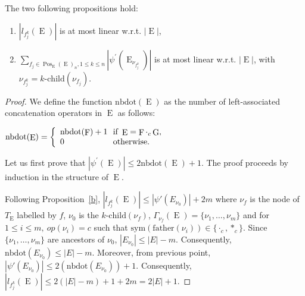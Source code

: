 \documentclass{llncs}
\def\Po#1#2{\Pos_{#1}{(#2)}}
\DeclareMathOperator{\E}{E}
\DeclareMathOperator{\f}{F}
\DeclareMathOperator{\G}{G}
\DeclareMathOperator{\Pos}{Pos}
\begin{document}
\begin{proposition}\label{prop long pseudo cont lin}
The two following propositions hold:
  \begin{enumerate}
    \item $|l_{f^k_j}(\E)|$ is at most linear w.r.t. $ |\E|$,
    \item $\sum_{f_j\in \Po{\E}{\E}_n,1\leq k\leq n} |\psi^{\prime}(\E_{\nu_{f^k_j}})| $ is at most linear w.r.t. $ |\E|$, with $\nu_{f^k_j}=k\mbox{-}\mathrm{child}(\nu_{f_j})$. 
  \end{enumerate} 
\end{proposition}
  \begin{proof}
  
We define the function $\mathrm{nbdot}(\E)$ as the number of 
left-associated
 concatenation operators
 in $\E$ as follows: 

\centerline{
    $\mathrm{nbdot}(\E)=
      \left\{
        \begin{array}{l@{\ }l}
          \mathrm{nbdot}(\f)+1 & \text{ if } \E=\f\cdot_c\G,\\
          0 & \text{ otherwise. }\\ 
        \end{array}
      \right.$
  }
 


 Let us first prove that $|\psi^{\prime}(\E)|\leq 2\mathrm{nbdot}(\E)+1$. The proof proceeds by induction in the structure of $\E$.

 


Following Proposition~\ref{b}, $|l_{f^k_j}(\E)|\leq | \psi'(E_{\nu_0})| +2m$ where $\nu_f$ is the node of $T_{\E}$ labelled by $f$, $\nu_0$ is the $k\mbox{-}\mathrm{child}(\nu_{f})$, $\Gamma_{\nu_{f}}(\E)=\{\nu_1, \dots,\nu_m \}$ and for $1\leq i\leq m,~op(\nu_i)=c$ such that $\mathrm{sym}(\mathrm{father}(\nu_i)) \in \{\cdot_c,{*_c}\}$. Since $\{\nu_1, \dots,\nu_m \}$ are ancestors of $\nu_0$, $|E_{\nu_0}|\leq |E|-m$. Consequently, $\mathrm{nbdot}(E_{\nu_0})\leq |E|-m$. Moreover, from previous point, $| \psi'(E_{\nu_0})|\leq 2(\mathrm{nbdot}(E_{\nu_0}))+1$. Consequently, $|l_{f^k_j}(\E)|\leq 2(|E|-m)+1 +2m=2|E|+1$.
  

\end{proof}
\end{document}
